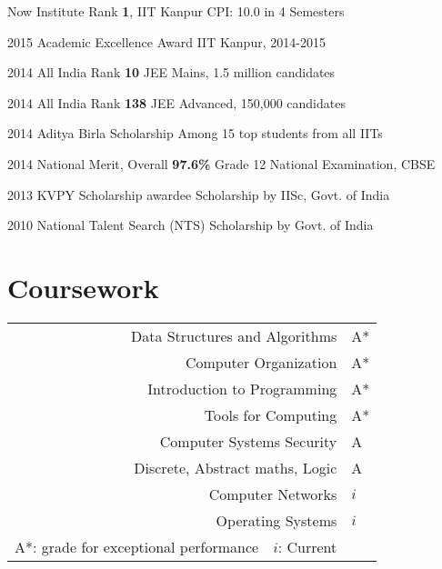 \documentclass{tccv}
\begin{document}
\begin{yearlist}

\item{\small{Now}}
  {Institute Rank \textbf{1}, IIT Kanpur}
  {\small{CPI: 10.0 in 4 Semesters}}

\item{\small{2015}}
  {Academic Excellence Award}
  {\small{IIT Kanpur, 2014-2015}}

\item{\small{2014}}
  {All India Rank \textbf{10}}
  {\small{JEE Mains, 1.5 million candidates}}

\item {\small{2014}}
  {All India Rank \textbf{138}}
  {\small{JEE Advanced, 150,000 candidates}}

\item {\small{2014}}
  {Aditya Birla Scholarship}
  {\small{Among 15 top students from all IITs}}

\item {\small{2014}}
  {National Merit, Overall \textbf{97.6\%}}
  {\small{Grade 12 National Examination, CBSE}}

\item {\small{2013}}
  {KVPY Scholarship awardee}
  {\small{Scholarship by IISc, Govt. of India}}

\item {\small{2010}}
  {National Talent Search (NTS)}
  {\small{Scholarship by Govt. of India}}

\end{yearlist}

\vspace{-0.6cm}
\section{Coursework}
\begin{tabularx}{\linewidth}{r l}
  Data Structures and Algorithms & A*\\
  Computer Organization & A*\\
  Introduction to Programming & A*\\
  Tools for Computing & A*\\
  Computer Systems Security & A\\
  Discrete, Abstract maths, Logic & A\\
  Computer Networks & $i$\\
  Operating Systems & $i$\\
  \footnotesize{A*: grade for exceptional
    performance\ \ $i$: Current}&\footnotesize{}\\
\end{tabularx}
\end{document}
